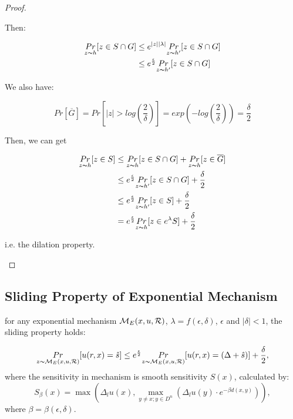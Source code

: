 \begin{proof}
\begin{itemize}
	Then:

	\begin{equation*}
	\begin{split}
	\underset{z \thicksim h}{Pr}[z \in S \cap G] 
	& \leq  e^{|z||\lambda|}\underset{z \thicksim h'}{Pr}[z \in S\cap G]\\
	& \leq e^{\frac{\epsilon}{2}} \underset{z \thicksim h'}{Pr}[z \in S \cap G]\\
	\end{split}
	\end{equation*}	


	We also have:

	\begin{equation*}
	Pr[\overline{G}] = Pr[|z| > log(\frac{2}{\delta})] = exp(-log(\frac{2}{\delta})) = \frac{\delta}{2}
	\end{equation*}

	Then, we can get

	\begin{equation*}
	\begin{split}
	\underset{z \thicksim h}{Pr}[z \in S] 
	& \leq \underset{z \thicksim h}{Pr}[z \in S\cap G] + \underset{z \thicksim h}{Pr}[z \in \overline{G}]\\
	& \leq e^{\frac{\epsilon}{2}} \underset{z \thicksim h'}{Pr}[z \in S \cap G] + \frac{\delta}{2}\\ 
	& \leq e^{\frac{\epsilon}{2}} \underset{z \thicksim h'}{Pr}[z \in S] + \frac{\delta}{2}\\ 
	& = e^{\frac{\epsilon}{2}} \underset{z \thicksim h}{Pr}[z \in e^{\lambda} S] + \frac{\delta}{2}\\ 
	\end{split}
	\end{equation*}	

	i.e. the dilation property.

\end{itemize}

\end{proof}

\subsection{Sliding Property of Exponential Mechanism}
\begin{lem}
for any exponential mechanism $\mathcal{M}_E(x, u, \mathcal{R})$, $\lambda = f(\epsilon, \delta)$, $\epsilon$ and $|\delta| < 1$, the sliding property holds:

\begin{equation*}
\underset{z \thicksim \mathcal{M}_E(x, u, \mathcal{R})}{Pr}[u(r,x) = \hat{s}]
\leq
e^{\frac{\epsilon}{2}} \underset{z \thicksim \mathcal{M}_E(x, u, \mathcal{R})}{Pr}[u(r,x) = (\Delta + \hat{s})] + \frac{\delta}{2},
\end{equation*}
where the sensitivity in mechanism is smooth sensitivity $S(x)$, calculated by:
\begin{equation*}
S_{\beta}(x) = \max(\Delta_{l}u(x), \max_{y \neq x; y \in D^{n}}(\Delta_{l}u(y)\cdot e^{-\beta d(x,y)})),
\end{equation*}
where $\beta = \beta(\epsilon, \delta)$.

\end{lem}

